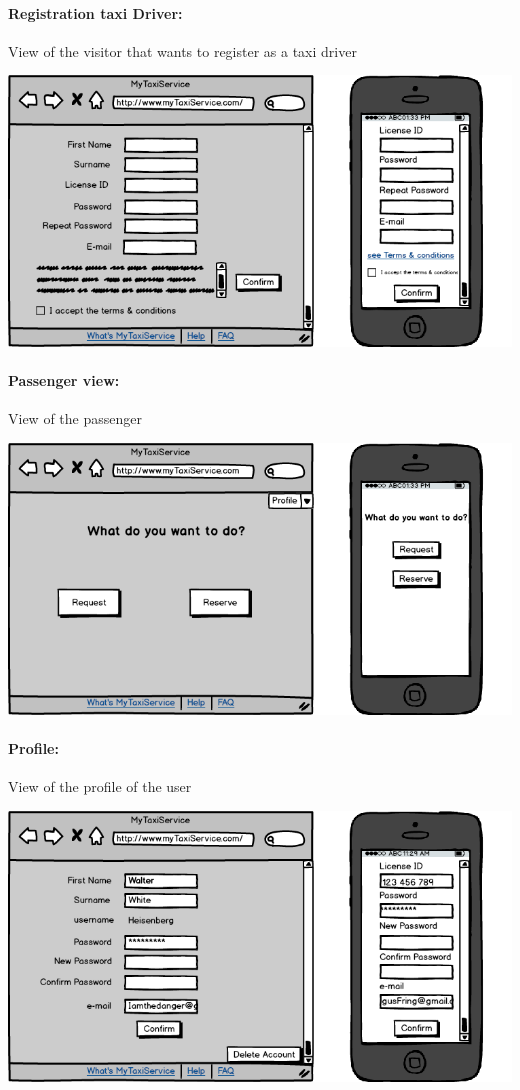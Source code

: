 \paragraph{Registration taxi Driver:}
View of the visitor that wants to register as a taxi driver
\begin{center}
	\includegraphics[width=\textwidth]{mockup/registrationTaxiDriver.png}
\end{center}

\paragraph{Passenger view:}
View of the passenger
\begin{center}
	\includegraphics[width=\textwidth]{mockup/passengersView.png}
\end{center}
\newpage
\paragraph{Profile:}
View of the profile of the user
\begin{center}
	\includegraphics[width=\textwidth]{mockup/profile.png}
\end{center}


